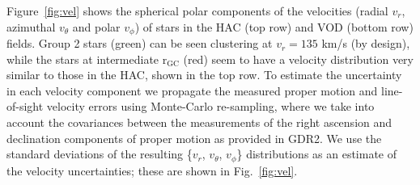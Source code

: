 \documentclass[fleqn,usenatbib]{mnras}
\begin{document}
Figure~\ref{fig:vel} shows the spherical polar components of the
velocities (radial $v_{r}$, azimuthal $v_{\theta}$ and polar
$v_{\phi}$) of stars in the HAC (top row) and VOD (bottom row)
fields. Group 2 stars (green) can be seen clustering at $v_{r} = 135$
km/s (by design), while the stars at intermediate $\mathrm{r_{GC}}$
(red) seem to have a velocity distribution very similar to those in
the HAC, shown in the top row. To estimate the uncertainty in each
velocity component we propagate the measured proper motion and
line-of-sight velocity errors using Monte-Carlo re-sampling, where we
take into account the covariances between the measurements of the
right ascension and declination components of proper motion as
provided in GDR2. We use the standard deviations of the resulting
\{$v_{r}$, $v_{\theta}$, $v_{\phi}$\} distributions as an estimate
of the velocity uncertainties; these are shown in Fig.~\ref{fig:vel}.
%
%
%
\end{document}

